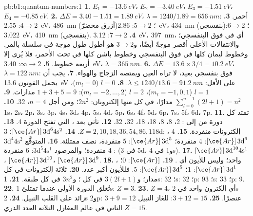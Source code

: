 \begin{solution}{pb:b1:quantum-numbers:1}
\textbf{1.} $E_1 = \qty{-13.6}{eV}$، $E_2 = \qty{-3.40}{eV}$،
$E_3 = \qty{-1.51}{eV}$، $E_4 = \qty{-0.85}{eV}$.
\textbf{2.} $\Delta E = 3.40 - 1.51 = \qty{1.89}{eV}$، $\lambda = 1240/1.89
= \qty{656}{nm}$: أحمر.
\textbf{3.} $4 \to 2$: \qty{2.55}{eV}، \qty{486}{nm} (أزرق مخضرّ)؛
$5 \to 2$: \qty{2.86}{eV}، \qty{434}{nm} (بنفسجي)؛ $6 \to 2$: \qty{3.022}{eV}،
\qty{410}{nm} (بنفسجي).
\textbf{4.} $7 \to 2$: \qty{3.12}{eV}، \qty{397}{nm}، أي في فوق البنفسجي؛
والانتقالات الأعلى أقصر موجةً أيضًا، و$3 \to 2$ هو أطول طول موجة
في سلسلة بالمر. وخطوط ليمان كلها في فوق البنفسجي وخطوط باشن
كلها في تحت الأحمر، فلا يُرى إلا أربعة خطوط.
\textbf{5.} $\infty \to 2$: \qty{3.40}{eV}، $\lambda = \qty{365}{nm}$.
\textbf{6.} $\Delta E = 13.6 \times 3/4 = \qty{10.2}{eV}$، $\lambda =
\qty{122}{nm}$: فوق بنفسجي بعيد، لا تراه العين ويمتصه
الزجاج والهواء.
\textbf{7.} يجب أن يحمل الفوتون \qty{13.6}{eV} على الأقل: $\lambda \le
1240/13.6 = \qty{91.2}{nm}$.
\textbf{8.} $l = 0$ ($m_l = 0$)، $l = 1$ ($m_l = -1, 0, 1$)، $l = 2$
($m_l = -2, \dots, 2$): $1 + 3 + 5 = 9$ مدارات.
\textbf{9.} $\sum_{l=0}^{n-1}(2l+1) = n^2$ مدارًا، في كل منها إلكترونان:
$2n^2$؛ ومن أجل $n = 4$، 32.
\textbf{10.} 1s، 2s، 2p، 3s، 3p، 4s، 3d، 4p، 5s، 4d، 5p، 6s، 4f، 5d، 6p،
7s، 5f، 6d، 7p.
\textbf{11.} تمتد كل دورة من  إلى : 2، 8، 8، 18، 18، 32، 32.
\textbf{12.} تأتي  بعد ، التي تفتح
الدورة 4.
\textbf{13.} $Z = 2, 10, 18, 36, 54, 86, 118$.
\textbf{14.} $[\ce{Ar}]\,3\text{d}^6 4\text{s}^2$؛ 3d: ،
4 إلكترونات منفردة.
\textbf{15.}  $[\ce{Ar}]\,3\text{d}^6$: 4 منفردة؛
 $[\ce{Ar}]\,3\text{d}^5$: 5 منفردة،  نصف ممتلئة.
\textbf{16.} المتوقَّع $3\text{d}^4 4\text{s}^2$: 4 منفردة؛ والمرصود
$3\text{d}^5 4\text{s}^1$: 6 منفردة (5 في 3d، و1 في 4s).
\textbf{17.}  $[\ce{Ar}]\,3\text{d}^{10} 4\text{s}^1$، 
$[\ce{Ar}]\,3\text{d}^{10}$،  $[\ce{Ar}]\,3\text{d}^9$.
\textbf{18.} ،  واحد؛ وليس للأيون  أي .
\textbf{19.}  $[\ce{Ar}]$: 0؛  $[\ce{Ar}]\,3\text{d}^1$:
1؛  $[\ce{Ar}]\,3\text{d}^5$: 5. فللأيون  أكبر عدد.
\textbf{20.} ثلاثة إلكترونات في كل مدار؛ و$3(2l + 1)$ في كل ؛
و$3n^2$ في كل طبقة.
\textbf{21.} 1s: 3؛ 2s: 3؛ 2p: 9؛ 3s: 3؛ 3p: 9.
\textbf{22.} تُغلق الدورة الأولى عندما تمتلئ 1s: $Z = 3$.
\textbf{23.} $Z = 4$، أي إلكترون واحد في 2s زائد على القلب النبيل.
\textbf{24.} 2s و2p: $3 + 9 = 12$ عنصرًا.
\textbf{25.} $3 + 12 = 15$: للغاز النبيل الثاني في عالم المغازل الثلاثة
العدد الذري \textbf{$Z = 15$}.
\end{solution}
